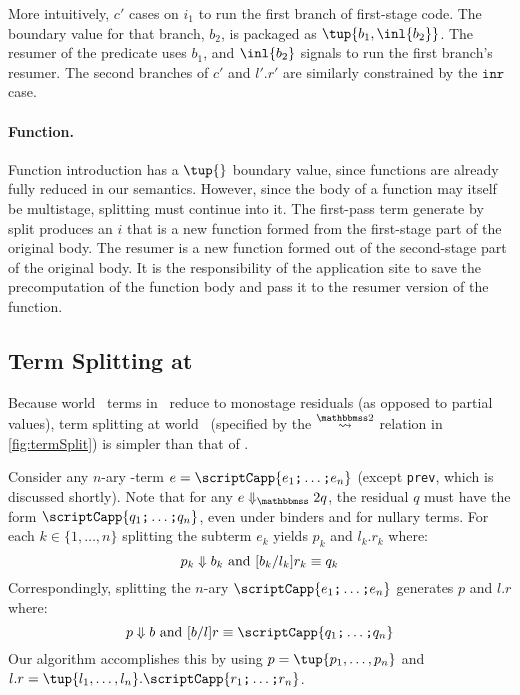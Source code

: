\begin{abstrsyn}
More intuitively, $c'$ cases on $i_1$ to run the first branch of first-stage
code. The boundary value for that branch, $b_2$, is packaged as $\tup {b_1, \inl
{b_2}}$. The resumer of the predicate uses $b_1$, and $\inl{b_2}$ signals to run
the first branch's resumer. The second branches of $c'$ and $l'.r'$ are
similarly constrained by the $\texttt{inr}$ case.


\paragraph {Function.} 
Function introduction has a $\tup{}$ boundary value, since functions
are already fully reduced in our semantics.  However, since the body
of a function may itself be multistage, splitting must continue into
it.  The first-pass term generate by split produces an $i$ that is a
new function formed from the first-stage part of the original body.
The resumer is a new function formed out of the second-stage part of
the original body.  It is the responsibility of the application site
to save the precomputation of the function body and pass it to the
resumer version of the function.

\subsection{Term Splitting at \bbtwo}

Because world \bbtwo\ terms in \lang\ reduce to monostage residuals
(as opposed to partial values), term splitting at world
\bbtwo\ (specified by the $\splittwosym$ relation in
\cref{fig:termSplit}) is simpler than that of \bbonem.

Consider any $n$-ary \bbtwo-term $e = \scriptCapp {e_1 \ttsemi \ldots
  \ttsemi e_n}$ (except \texttt{prev}, which is discussed shortly).
Note that for any $\diatwo e q$, the residual $q$ must have the form
$\scriptCapp {q_1 \ttsemi \ldots \ttsemi q_n}$, even under binders and
for nullary terms.  For each $k \in \{1,\ldots,n\}$ splitting the
subterm $e_k$ yields $p_k$ and $l_k.r_k$ where:
\[
	{p_k} \Downarrow {b_k} \text{ and } [{b_k}/{l_k}]{r_k} \equiv {q_k}
\]
Correspondingly, splitting the $n$-ary $\scriptCapp {e_1 \ttsemi \ldots \ttsemi e_n}$ generates $p$ and $l.r$ where:
\[
	\reduce p b \text{ and } [b/l]r \equiv \scriptCapp {q_1 \ttsemi \ldots \ttsemi q_n}
\]
Our algorithm accomplishes this by using $p = \tup {p_1, \ldots, p_n}$ and
$l.r = \tup {l_1, \ldots, l_n}.\scriptCapp {r_1 \ttsemi \ldots \ttsemi r_n}$.


\end{abstrsyn}

